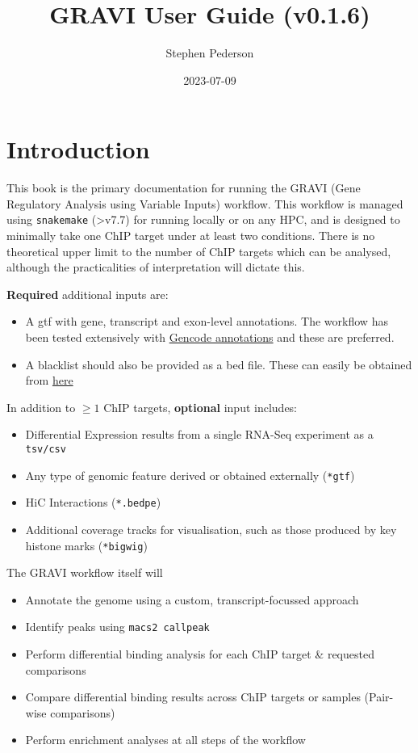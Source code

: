 \documentclass[
]{book}
\title{GRAVI User Guide (v0.1.6)}
\author{Stephen Pederson}
\date{2023-07-09}
\providecommand{\tightlist}{%
  \setlength{\itemsep}{0pt}\setlength{\parskip}{0pt}}
\begin{document}
\maketitle

{
\setcounter{tocdepth}{1}
\tableofcontents
}
\hypertarget{introduction}{%
\chapter{Introduction}\label{introduction}}

This book is the primary documentation for running the GRAVI (Gene Regulatory Analysis using Variable Inputs) workflow.
This workflow is managed using \texttt{snakemake} (\textgreater v7.7) for running locally or on any HPC, and is designed to minimally take one ChIP target under at least two conditions.
There is no theoretical upper limit to the number of ChIP targets which can be analysed, although the practicalities of interpretation will dictate this.

\textbf{Required} additional inputs are:

\begin{itemize}
\tightlist
\item
  A gtf with gene, transcript and exon-level annotations. The workflow has been tested extensively with \href{https://www.gencodegenes.org/}{Gencode annotations} and these are preferred.
\item
  A blacklist should also be provided as a bed file. These can easily be obtained from \href{https://github.com/Boyle-Lab/Blacklist/tree/master/lists}{here}
\end{itemize}

In addition to \(\geq 1\) ChIP targets, \textbf{optional} input includes:

\begin{itemize}
\tightlist
\item
  Differential Expression results from a single RNA-Seq experiment as a \texttt{tsv/csv}
\item
  Any type of genomic feature derived or obtained externally (\texttt{*gtf})
\item
  HiC Interactions (\texttt{*.bedpe})
\item
  Additional coverage tracks for visualisation, such as those produced by key histone marks (\texttt{*bigwig})
\end{itemize}

The GRAVI workflow itself will

\begin{itemize}
\tightlist
\item
  Annotate the genome using a custom, transcript-focussed approach
\item
  Identify peaks using \texttt{macs2\ callpeak}
\item
  Perform differential binding analysis for each ChIP target \& requested comparisons
\item
  Compare differential binding results across ChIP targets or samples (Pair-wise comparisons)
\item
  Perform enrichment analyses at all steps of the workflow
\end{itemize}
\end{document}
